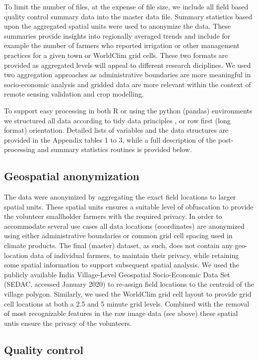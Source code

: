 \documentclass[, manuscript]{copernicus}
\begin{document}
To limit the number of files, at the expense of file size, we include
all field based quality control summary data into the master data file.
Summary statistics based upon the aggregated spatial units were used to
anonymize the data. These summaries provide insights into regionally
averaged trends and include for example the number of farmers who
reported irrigation or other management practices for a given town or
WorldClim grid cells. These two formats are provided as aggregated
levels will appeal to different research diciplines. We used two
aggregation approaches as administrative boundaries are more meaningful
in socio-economic analysis and gridded data are more relevant within the
context of remote sensing validation and crop modelling.

To support easy processing in both R or using the python (pandas)
environments we structured all data according to tidy data principles
\citep{wickham2014}, or row first (long format) orientation. Detailed
lists of variables and the data structures are provided in the Appendix
tables 1 to 3, while a full description of the post-processing and
summary statistics routines is provided below.

\subsection{Geospatial anonymization}

The data were anonymized by aggregating the exact field locations to
larger spatial units. These spatial units ensures a suitable level of
obfuscation to provide the volunteer smallholder farmers with the
required privacy. In order to accommodate several use cases all data
locations (coordinates) are anonymized using either administrative
boundaries or common grid cell spacing used in climate products. The
final (master) dataset, as such, does not contain any geo-location data
of individual farmers, to maintain their privacy, while retaining some
spatial information to support subsequent spatial analysis. We used the
publicly available India Village-Level Geospatial Socio-Economic Data
Set (SEDAC, accessed January 2020) to re-assign field locations to the
centroid of the village polygon. Similarly, we used the WorldClim
\citep{Hijmans2005} grid cell layout to provide grid cell locations at
both a 2.5 and 5 minute grid levels. Combined with the removal of most
recognizable features in the raw image data (see above) these spatial
untis ensure the privacy of the volunteers.

\subsection{Quality control}
\end{document}

